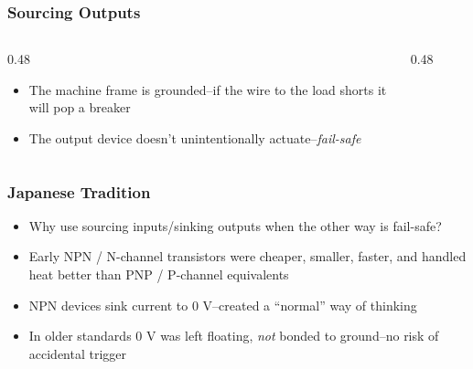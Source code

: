 \begin{frame}
    \frametitle{Sourcing Outputs}

    \begin{columns}
        \begin{column}{0.48\linewidth}
            \begin{itemize}
                \item The machine frame is grounded--if the wire to the load shorts it will pop a breaker
                \item The output device doesn't unintentionally actuate--\emph{fail-safe}
            \end{itemize}
        \end{column}
        \begin{column}{0.48\linewidth}
            \begin{figure}
                \centering
                \resizebox{0.75\columnwidth}{!}{
                    
                }
            \end{figure}

            \vspace{0.5em}

            \begin{figure}
                \centering
                \resizebox{0.75\columnwidth}{!}{
                    
                }
            \end{figure}            
        \end{column}
    \end{columns}
\end{frame}

\begin{frame}
    \frametitle{Japanese Tradition}

    \begin{itemize}
        \item Why use sourcing inputs/sinking outputs when the other way is fail-safe?
        \item Early NPN / N-channel transistors were cheaper, smaller, faster, and handled heat better than PNP / P-channel equivalents
        \item NPN devices sink current to 0 V--created a ``normal'' way of thinking
        \item In older standards 0 V was left floating, \emph{not} bonded to ground--no risk of accidental trigger
    \end{itemize}
\end{frame}

